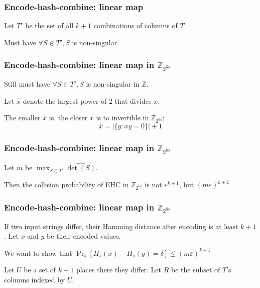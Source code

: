 \documentclass[xcolor=dvipsnames,hyperref={hidelinks}]{beamer}
\begin{document}
\begin{frame}
  \frametitle{Encode-hash-combine: linear map}

  Let $T'$ be the set of all $k+1$ combinations of columns of $T$
  \pause

  $ $\\
  Must have $\forall S \in T', S$ is non-singular
\end{frame}

\begin{frame}

  \frametitle{Encode-hash-combine: linear map \textbf{ in $\mathbb{Z}_{2^{64}}$}}

  Still must have $\forall S \in T', S$ is non-singular in $\mathbb{Z}$.
  \pause

  $ $\\
  Let $\widehat{x}$ denote the largest power of $2$ that divides $x$.
  \pause

  $ $\\
  The smaller $\widehat{x}$ is, the closer $x$ is to invertible in $\mathbb{Z}_{2^{64}}$:
  \[
  \widehat{x} = \left|\{y : xy = 0\}\right| + 1
  \]
\end{frame}

\begin{frame}

  \frametitle{Encode-hash-combine: linear map \textbf{ in $\mathbb{Z}_{2^{64}}$}}

  Let $m$ be $\max_{S \in T'} \widehat{\det(S)}$.
  \pause

  $ $ \\
  Then the collision probability of EHC in $\mathbb{Z}_{2^{64}}$ is not $\varepsilon^{k+1}$, but $(m \varepsilon)^{k+1}$
\end{frame}

\begin{frame}
  \frametitle{Encode-hash-combine: linear map \textbf{ in $\mathbb{Z}_{2^{64}}$}}

  If two input strings differ, their Hamming distance after encoding is at least $k+1$.
  Let $x$ and $y$ be their encoded values.
  \pause

  $ $\\
  We want to show that $\Pr_s\left[H_s(x)-H_s(y) = \delta\right] \le (m \varepsilon)^{k+1}$
  \pause

  $ $\\
  Let $U$ be a set of $k+1$ places there they differ. Let $R$ be the subset of $T$'s columns indexed by $U$.
\end{frame}
\end{document}
